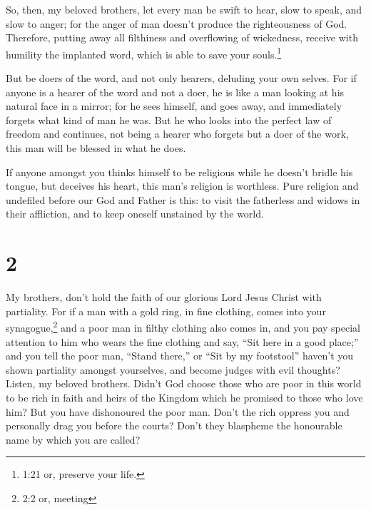  So, then, my beloved brothers, let every man be swift to
hear, slow to speak, and slow to anger;  for the anger of
man doesn't produce the righteousness of God.  Therefore,
putting away all filthiness and overflowing of wickedness, receive with
humility the implanted word, which is able to save your
souls.\footnote{1:21 or, preserve your life.}

 But be doers of the word, and not only hearers, deluding
your own selves.  For if anyone is a hearer of the word and
not a doer, he is like a man looking at his natural face in a mirror;
 for he sees himself, and goes away, and immediately
forgets what kind of man he was.  But he who looks into the
perfect law of freedom and continues, not being a hearer who forgets but
a doer of the work, this man will be blessed in what he does.

 If anyone amongst you thinks himself to be religious while
he doesn't bridle his tongue, but deceives his heart, this man's
religion is worthless.  Pure religion and undefiled before
our God and Father is this: to visit the fatherless and widows in their
affliction, and to keep oneself unstained by the world.

\hypertarget{section-1}{%
\section{2}\label{section-1}}

 My brothers, don't hold the faith of our glorious Lord
Jesus Christ with partiality.  For if a man with a gold
ring, in fine clothing, comes into your synagogue,\footnote{2:2 or,
  meeting} and a poor man in filthy clothing also comes in, 
and you pay special attention to him who wears the fine clothing and
say, ``Sit here in a good place;'' and you tell the poor man, ``Stand
there,'' or ``Sit by my footstool''  haven't you shown
partiality amongst yourselves, and become judges with evil thoughts?
 Listen, my beloved brothers. Didn't God choose those who
are poor in this world to be rich in faith and heirs of the Kingdom
which he promised to those who love him?  But you have
dishonoured the poor man. Don't the rich oppress you and personally drag
you before the courts?  Don't they blaspheme the honourable
name by which you are called?

